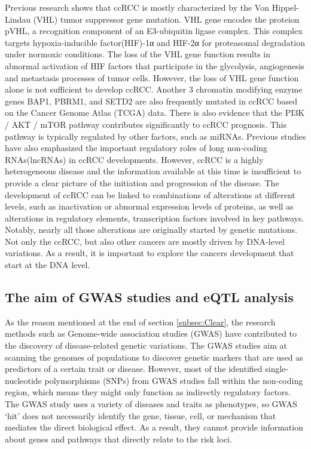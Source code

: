 Previous research shows that ccRCC is mostly characterized by the Von Hippel-Lindau (VHL) tumor suppressor gene mutation. VHL gene encodes the proteion pVHL, a recognition component of an E3-ubiquitin ligase complex. This complex targets hypoxia-inducible factor(HIF)-1α and HIF-2α for proteasomal degradation under normoxic conditions. The loss of the VHL gene function results in abnormal activation of HIF factors that participate in the glycolysis, angiogenesis and metastasis processes of tumor cells. However, the loss of VHL gene function alone is not sufficient to develop ccRCC\cite{sanchez_genetic_2018}. Another 3 chromatin modifying enzyme genes BAP1, PBRM1, and SETD2 are also frequently mutated in ccRCC based on the Cancer Genome Atlas (TCGA) data\cite{eckel-passow_8q24_2020}. There is also evidence that the PI3K / AKT / mTOR pathway contributes significantly to ccRCC prognosis. This pathway is typically regulated by other factors, such as miRNAs\cite{braga_molecular_2019}. Previous studies have also emphasized the important regulatory roles of long non-coding RNAs(lncRNAs)\cite{zeng_prognosis_2019} in ccRCC developments. However, ccRCC is a highly heterogeneous disease and the information available at this time is insufficient to provide a clear picture of the initiation and progression of the disease. The development of ccRCC can be linked to combinations of alterations at different levels, such as inactivation or abnormal expression levels of proteins, as well as alterations in regulatory elements, transcription factors involved in key pathways. Notably, nearly all those alterations are originally started by genetic mutations. Not only the ccRCC, but also other cancers are mostly driven by DNA-level variations. As a result, it is important to explore the cancers development that start at the DNA level.


\subsection{The aim of GWAS studies and eQTL analysis}

As the reason mentioned at the end of section \ref{subsec:Clear}, the research methods such as Genome-wide association studies (GWAS) have contributed to the discovery of disease-related genetic variations. The GWAS studies aim at scanning the genomes of populations to discover genetic markers that are used as predictors of a certain trait or disease. However, most of the identified single-nucleotide polymorphisms (SNPs) from GWAS studies fall within the non-coding region, which means they might only function as indirectly regulatory factors. The GWAS study uses a variety of diseases and traits as phenotypes, so GWAS ‘hit’ does not necessarily identify the gene, tissue, cell, or mechanism that mediates the direct biological effect\cite{sampson_glomerular_2019}. As a result, they cannot provide information about genes and pathways that directly relate to the risk loci.
 
